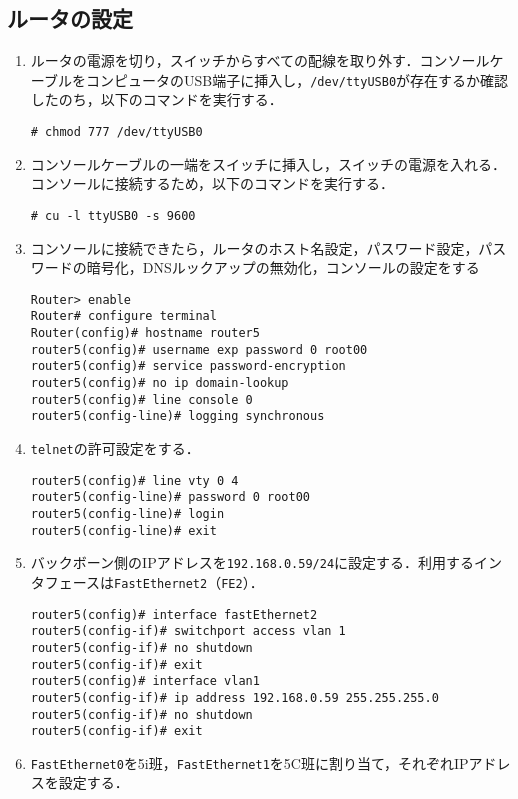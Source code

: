 \subsection{ルータの設定}
\begin{enumerate}
    \renewcommand{\labelenumi}{\textbf{\theenumi.}\ }
    \item ルータの電源を切り，スイッチからすべての配線を取り外す．コンソールケーブルをコンピュータのUSB端子に挿入し，\texttt{/dev/ttyUSB0}が存在するか確認したのち，以下のコマンドを実行する．
          \begin{lstlisting}
# chmod 777 /dev/ttyUSB0 
    \end{lstlisting}
    \item コンソールケーブルの一端をスイッチに挿入し，スイッチの電源を入れる．コンソールに接続するため，以下のコマンドを実行する．
          \begin{lstlisting}
# cu -l ttyUSB0 -s 9600                
            \end{lstlisting}
    \item コンソールに接続できたら，ルータのホスト名設定，パスワード設定，パスワードの暗号化，DNSルックアップの無効化，コンソールの設定をする
          \begin{lstlisting}
Router> enable
Router# configure terminal
Router(config)# hostname router5
router5(config)# username exp password 0 root00
router5(config)# service password-encryption
router5(config)# no ip domain-lookup
router5(config)# line console 0
router5(config-line)# logging synchronous
\end{lstlisting}
    \item \texttt{telnet}の許可設定をする．
          \begin{lstlisting}
router5(config)# line vty 0 4
router5(config-line)# password 0 root00
router5(config-line)# login
router5(config-line)# exit
\end{lstlisting}
    \item バックボーン側のIPアドレスを\texttt{192.168.0.59/24}に設定する．利用するインタフェースは\texttt{FastEthernet2}（\texttt{FE2}）．
          \begin{lstlisting}
router5(config)# interface fastEthernet2
router5(config-if)# switchport access vlan 1
router5(config-if)# no shutdown
router5(config-if)# exit
router5(config)# interface vlan1
router5(config-if)# ip address 192.168.0.59 255.255.255.0
router5(config-if)# no shutdown
router5(config-if)# exit
    \end{lstlisting}
    \item \texttt{FastEthernet0}を5i班，\texttt{FastEthernet1}を5C班に割り当て，それぞれIPアドレスを設定する．

\end{enumerate}
